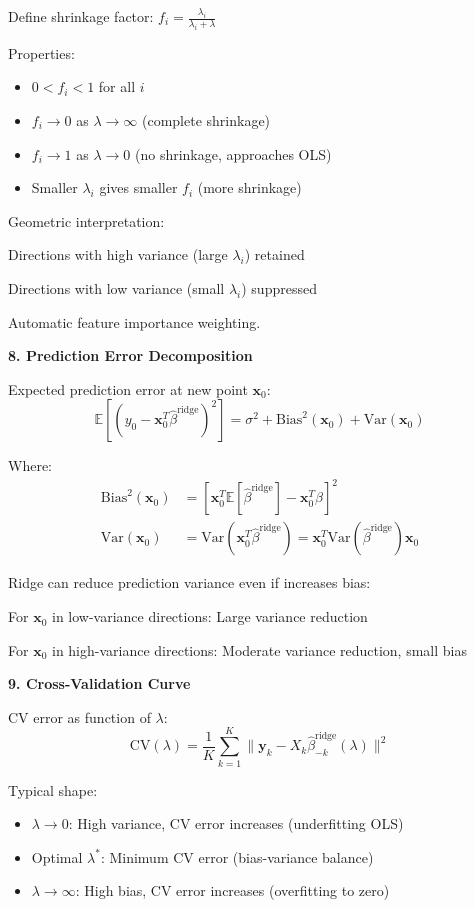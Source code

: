\documentclass[12pt]{article}
\begin{document}
\begin{explanation}
Define shrinkage factor: $f_i = \frac{\lambda_i}{\lambda_i + \lambda}$

Properties:
\begin{itemize}
\item $0 < f_i < 1$ for all $i$
\item $f_i \to 0$ as $\lambda \to \infty$ (complete shrinkage)
\item $f_i \to 1$ as $\lambda \to 0$ (no shrinkage, approaches OLS)
\item Smaller $\lambda_i$ gives smaller $f_i$ (more shrinkage)
\end{itemize}

Geometric interpretation:

Directions with high variance (large $\lambda_i$) retained

Directions with low variance (small $\lambda_i$) suppressed

Automatic feature importance weighting.

\textbf{8. Prediction Error Decomposition}

Expected prediction error at new point $\mathbf{x}_0$:
\[\mathbb{E}[(y_0 - \mathbf{x}_0^T\hat{\beta}^{\text{ridge}})^2] = \sigma^2 + \text{Bias}^2(\mathbf{x}_0) + \text{Var}(\mathbf{x}_0)\]

Where:
\begin{align*}
\text{Bias}^2(\mathbf{x}_0) &= [\mathbf{x}_0^T\mathbb{E}[\hat{\beta}^{\text{ridge}}] - \mathbf{x}_0^T\beta]^2 \\
\text{Var}(\mathbf{x}_0) &= \text{Var}(\mathbf{x}_0^T\hat{\beta}^{\text{ridge}}) = \mathbf{x}_0^T \text{Var}(\hat{\beta}^{\text{ridge}}) \mathbf{x}_0
\end{align*}

Ridge can reduce prediction variance even if increases bias:

For $\mathbf{x}_0$ in low-variance directions: Large variance reduction

For $\mathbf{x}_0$ in high-variance directions: Moderate variance reduction, small bias

\textbf{9. Cross-Validation Curve}

CV error as function of $\lambda$:
\[\text{CV}(\lambda) = \frac{1}{K}\sum_{k=1}^{K} \|\mathbf{y}_k - X_k\hat{\beta}_{-k}^{\text{ridge}}(\lambda)\|^2\]

Typical shape:
\begin{itemize}
\item $\lambda \to 0$: High variance, CV error increases (underfitting OLS)
\item Optimal $\lambda^*$: Minimum CV error (bias-variance balance)
\item $\lambda \to \infty$: High bias, CV error increases (overfitting to zero)
\end{itemize}


\end{explanation}
\end{document}
